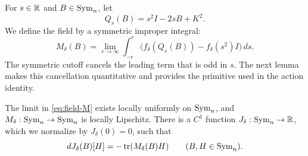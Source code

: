 For $s\in\mathbb R$ and $B\in\operatorname{Sym}_n$, let
\begin{equation}\label{eq:field-Q}
 Q_s(B)=s^2I-2sB+K^2.
\end{equation}
We define the field by a symmetric improper integral:
\begin{equation}\label{eq:field-M}
 M_\delta(B)=\lim_{r\to\infty}\int_{-r}^r
       \bigl(f_\delta(Q_s(B))-f_\delta(s^2)I\bigr)\,ds.
\end{equation}
The symmetric cutoff cancels the leading term that is odd in $s$.
The next lemma makes this cancellation quantitative and provides the
primitive used in the action identity.

\begin{lemma}\label{lem:field-regularity}
The limit in \eqref{eq:field-M} exists locally uniformly on $\operatorname{Sym}_n$,
and $M_\delta:\operatorname{Sym}_n\to\operatorname{Sym}_n$ is locally Lipschitz.  There is a
$C^1$ function $J_\delta:\operatorname{Sym}_n\to\mathbb R$, which we normalize by
$J_\delta(0)=0$, such that
\begin{equation}\label{eq:field-primitive}
 dJ_\delta(B)[H]=-\operatorname{tr}(M_\delta(B)H)
       \qquad (B,H\in\operatorname{Sym}_n).
\end{equation}
\end{lemma}

